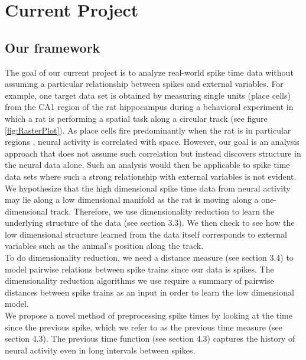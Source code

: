 
\section{Current Project}

\subsection{Our framework}
The goal of our current project  is to analyze real-world spike time data without assuming a particular relationship between spikes and external variables. For example, one target data set is  obtained by measuring single units (place cells)  from the CA1 region of the rat hippocampus during a behavioral experiment in which a rat is performing a spatial task along a circular track (see figure \ref{fig:RasterPlot}). As place cells fire predominantly when the rat is in  particular regions \cite{o1971hippocampus, Burgess1994}, neural activity is correlated with space. However, our goal is an analysis approach that does not assume such correlation but instead discovers structure in the neural data alone. Such an analysis would then be applicable to spike time data sets where such a strong relationship with external variables is not evident.\\

We hypothesize that the high dimensional spike time data from neural activity may lie along a low dimensional manifold 
as the rat is moving along a one-dimensional track.  Therefore, we use dimensionality  reduction to learn the underlying
structure of the data (see section 3.3). We then  check to see how the low dimensional structure learned from the 
data itself corresponds to external variables such as the animal's position along the track.\\

To do dimensionality reduction, we need a distance measure  (see  section 3.4) to model pairwise relations between spike trains since our data is spikes. The dimensionality reduction algorithms we use require a summary of pairwise distances between spike trains as an input in order to learn the low dimensional model.\\

We propose a novel method of preprocessing spike times by looking at the time since the previous spike, which we refer to
as the previous time measure (see section 4.3). The previous time function (see section 4.3) captures the history of neural activity even in long intervals between spikes.\\

